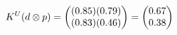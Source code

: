 \documentclass[preview]{standalone}
\begin{document}
\begin{align*}
\special{dvisvgm:raw <g id='unique000'>}K^U(d \otimes p) = \begin{pmatrix} (0.85)(0.79) \\ (0.83)(0.46) \end{pmatrix} = \begin{pmatrix} 0.67 \\ 0.38 \end{pmatrix}\special{dvisvgm:raw </g>}
\end{align*}
\end{document}
